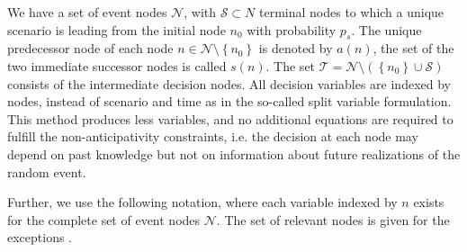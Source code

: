 \begin{figure}[htb]
{
\endpsmatrix}
\end{figure}

We have a set of event nodes $\mathcal{N}$, with $\mathcal{S}\subset {N}$ terminal nodes to which a unique scenario is leading from the initial node $n_0$ with probability $p_s$. The unique predecessor node of each node $n\in\mathcal{N}\setminus \left\{n_0\right\}$ is denoted by $a(n)$, the set of the two immediate successor nodes is called $s(n)$. The set $\mathcal{T}= \mathcal{N}\setminus\left(\left\{n_0\right\}\cup\mathcal{S}\right)$ consists of the intermediate decision nodes. All decision variables are indexed by nodes, instead of scenario and time as in the so-called split variable formulation. This method produces less variables, and no additional equations are required to fulfill the non-anticipativity constraints, i.e. the decision at each node may depend on past knowledge but not on information about future realizations of the random event. 

Further, we use the following notation, where each variable indexed by $n$ exists for the complete set of event nodes $\mathcal{N}$. The set of relevant nodes is given for the exceptions .

